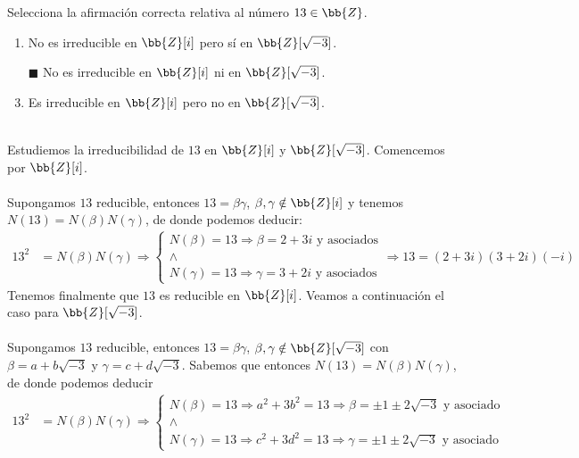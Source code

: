 \documentclass[12pt]{article}
\begin{document}
    \begin{ejercicio}[1 punto]
        Selecciona la afirmación correcta relativa al número $13\in \bb{Z}$.
        \begin{enumerate}[label=$\square$]
            \item No es irreducible en $\bb{Z}[i]$ pero sí en $\bb{Z}[\sqrt{-3}]$.
            \item[{$\blacksquare$}] No es irreducible en $\bb{Z}[i]$ ni en $\bb{Z}[\sqrt{-3}]$.
            \item Es irreducible en $\bb{Z}[i]$ pero no en $\bb{Z}[\sqrt{-3}]$.
        \end{enumerate}~\\
        Estudiemos la irreducibilidad de $13$ en $\bb{Z}[i]$ y $\bb{Z}[\sqrt{-3}]$. Comencemos por $\bb{Z}[i]$. \\ \\
        Supongamos $13$ reducible, entonces $13=\beta\gamma$, $\beta,\gamma\notin \bb{Z}[i]$ y tenemos $\mbox{$N(13)=N(\beta)N(\gamma)$}$, de donde podemos deducir:
        \begin{align*}
            13^2&=N(\beta)N(\gamma) \Longrightarrow \left\{
            \begin{array}{c}
                N(\beta)=13 \Longrightarrow \beta=2+3i \text{ y asociados} \\ 
                \wedge \\
                N(\gamma)=13 \Longrightarrow \gamma=3+2i \text{ y asociados}
            \end{array}\right. 
            \Longrightarrow 13=(2+3i)(3+2i)(-i)
        \end{align*}
        Tenemos finalmente que $13$ es reducible en $\bb{Z}[i]$. Veamos a continuación el caso para $\bb{Z}[\sqrt{-3}]$. \\ \\
        Supongamos $13$ reducible, entonces $13=\beta\gamma$, $\beta,\gamma\notin \bb{Z}[\sqrt{-3}]$ con $\beta=a+b\sqrt{-3}$ y $\gamma=c+d\sqrt{-3}$. Sabemos que entonces
        $N(13)=N(\beta)N(\gamma)$, de donde podemos deducir
        \begin{align*}
            13^2&=N(\beta)N(\gamma) \Longrightarrow \left\{
            \begin{array}{c}
                N(\beta)=13 \Longrightarrow a^2+3b^2=13\Longrightarrow \beta=\pm1\pm2\sqrt{-3} \text{ y asociado} \\
                \wedge \\
                N(\gamma)=13 \Longrightarrow c^2+3d^2=13\Longrightarrow \gamma=\pm1\pm2\sqrt{-3} \text{ y asociado}

\end{array}
\end{align*}
\end{ejercicio}
\end{document}
